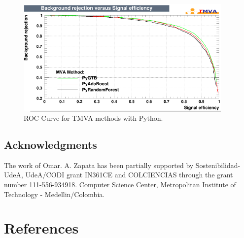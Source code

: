\documentclass[a4paper]{jpconf}
\begin{document}
\begin{figure}[h]
\centering
\includegraphics[width=25pc]{img/pymvaroc.png}\caption{\label{pymvaroc} ROC Curve for TMVA methods with Python.}
\end{figure}

\clearpage
\subsection{Acknowledgments}
The work of Omar. A. Zapata has been partially supported by Sostenibilidad-UdeA, UdeA/CODI grant IN361CE
and COLCIENCIAS through the grant number 111-556-934918.\newline
Computer Science Center, Metropolitan Institute of Technology - Medellin/Colombia.


\section*{References}

\end{document}
